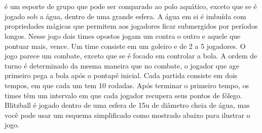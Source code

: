 %
\\\\
%
 é um esporte de grupo que pode ser comparado ao polo aquático, exceto que se é jogado sob a água, dentro de uma grande esfera. 
A água em si é imbuída com propriedades mágicas que permitem aos jogadores ficar submergidos por períodos longos.
Nesse jogo dois times opostos jogam um contra o outro e aquele que pontuar mais, vence.
Um time consiste em um goleiro e de 2 a 5 jogadores.
O jogo parece um combate, exceto que se é focado em controlar a bola.
A ordem de turno é determinado da mesma maneira que no combate, o jogador que age primeiro pega a bola após o pontapé inicial.
Cada partida consiste em dois tempos, em que cada um tem 10 rodadas.
Após terminar o primeiro tempo, os times têm um intervalo em que cada jogador recupera seus pontos de fôlego.
Blitzball é jogado dentro de uma esfera de 15u de diâmetro cheia de água, mas você pode usar um esquema simplificado como mostrado abaixo para ilustrar o jogo.
%
\vfill
%
